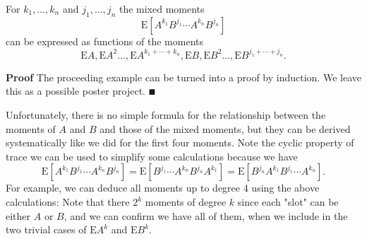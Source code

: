 \begin{lemma} For $k_1,\ensuremath{\ldots},k_n$ and $j_1,\ensuremath{\ldots},j_n$ the mixed moments
\[
\ensuremath{\bm{\mathrm{E}}}[A^{k_1} B^{j_1} \ensuremath{\cdots} A^{k_n} B^{j_n}]
\]
can be expressed as functions of the moments
\[
\ensuremath{\bm{\mathrm{E}}}A, \ensuremath{\bm{\mathrm{E}}} A^2 \ensuremath{\ldots}, \ensuremath{\bm{\mathrm{E}}}A^{k_1 + \ensuremath{\cdots} + k_n}, \ensuremath{\bm{\mathrm{E}}}B, \ensuremath{\bm{\mathrm{E}}}B^2  \ensuremath{\ldots}, \ensuremath{\bm{\mathrm{E}}}B^{j_1 + \ensuremath{\cdots} + j_n}.
\]
\end{lemma}
\textbf{Proof} The proceeding example can be turned into a proof by induction. We leave this as a possible poster project. \ensuremath{\QED}

Unfortunately, there is no simple formula for the relationship between the moments of $A$ and $B$ and those of the mixed moments, but they can be derived systematically like we did for the first four moments. Note the cyclic property of trace we can be used to simplify some calculations because we have
\[
\ensuremath{\bm{\mathrm{E}}}[A^{k_1} B^{j_1} \ensuremath{\cdots} A^{k_n} B^{j_n}] = \ensuremath{\bm{\mathrm{E}}}[ B^{j_1} \ensuremath{\cdots} A^{k_n} B^{j_n} A^{k_1}] = 
\ensuremath{\bm{\mathrm{E}}}[B^{j_n} A^{k_1} B^{j_1} \ensuremath{\cdots} A^{k_n}].
\]
For example, we can deduce all moments up to degree 4 using the above calculations:
Note that there $2^k$ moments of degree $k$ since each "slot" can be either $A$ or $B$, and we can confirm we have all of them, when we include in the two trivial cases of $\ensuremath{\bm{\mathrm{E}}}A^k$ and $\ensuremath{\bm{\mathrm{E}}}B^k$. 


